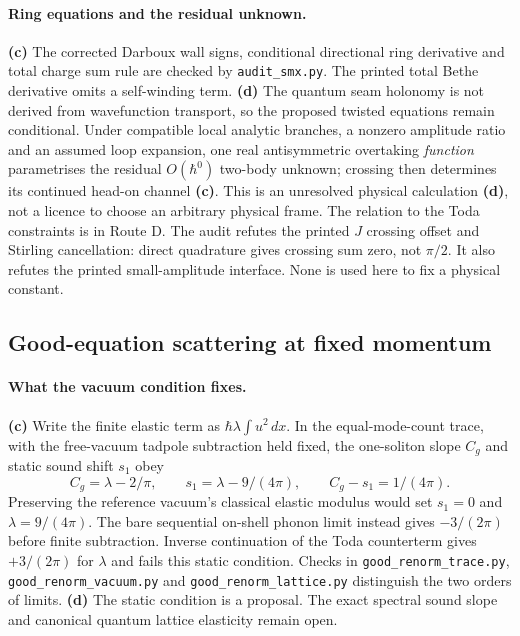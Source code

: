 \documentclass[11pt,a4paper]{article}
\newcommand{\Lc}{\textsf{\textbf{(c)}}\xspace}
\newcommand{\Ld}{\textsf{\textbf{(d)}}\xspace}
\newcommand{\file}[1]{\nolinkurl{#1}}
\theoremstyle{remark}\newtheorem{remark}[proposition]{Remark}
\begin{document}
\paragraph{Ring equations and the residual unknown.}
\Lc The corrected Darboux wall signs, conditional directional ring derivative
and total charge sum rule are checked by \file{audit_smx.py}. The printed total
Bethe derivative omits a self-winding term. \Ld The quantum seam holonomy is
not derived from wavefunction transport, so the proposed twisted equations
remain conditional. Under compatible local analytic branches, a nonzero
amplitude ratio and an assumed loop expansion, one real antisymmetric
overtaking \emph{function} parametrises the residual $O(\hbar^0)$ two-body
unknown; crossing then determines its continued head-on channel \Lc.
This is an unresolved physical calculation \Ld, not a licence to choose an
arbitrary physical frame. The relation to the Toda constraints is in Route D.
The audit refutes the printed $J$ crossing offset and Stirling cancellation:
direct quadrature gives crossing sum zero, not $\pi/2$. It also refutes the
printed small-amplitude interface. None is used here to fix a physical constant.

\subsection{Good-equation scattering at fixed momentum}\label{sec:good}
\paragraph{What the vacuum condition fixes.}
\Lc Write the finite elastic term as $\hbar\lambda\int u^2\,dx$. In the
equal-mode-count trace, with the free-vacuum tadpole subtraction held fixed,
the one-soliton slope $C_g$ and static sound shift $s_1$ obey
\[
 C_g=\lambda-2/\pi,\qquad s_1=\lambda-9/(4\pi),\qquad C_g-s_1=1/(4\pi).
\]
Preserving the reference vacuum's classical elastic modulus would set
$s_1=0$ and $\lambda=9/(4\pi)$. The bare sequential on-shell phonon limit
instead gives $-3/(2\pi)$ before finite subtraction. Inverse continuation
of the Toda counterterm gives $+3/(2\pi)$ for $\lambda$ and fails this
static condition. Checks in \file{good_renorm_trace.py},
\file{good_renorm_vacuum.py} and \file{good_renorm_lattice.py} distinguish
the two orders of limits. \Ld The static condition is a proposal. The exact
spectral sound slope and canonical quantum lattice elasticity remain open.
\end{document}
